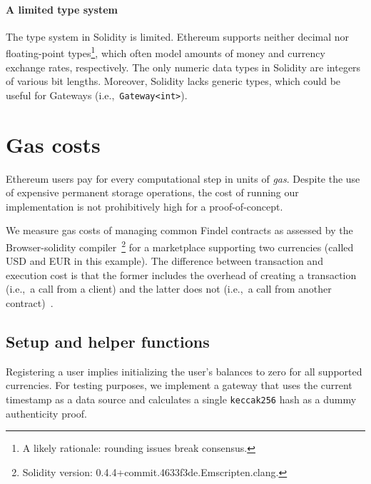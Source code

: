 \paragraph{A limited type system}
The type system in Solidity is limited.
Ethereum supports neither decimal nor floating-point types\footnote{A likely rationale: rounding issues break consensus.}, which often model amounts of money and currency exchange rates, respectively.
The only numeric data types in Solidity are integers of various bit lengths.
Moreover, Solidity lacks generic types, which could be useful for Gateways (i.e.,~\texttt{Gateway<int>}).


\section{Gas costs} \label{sec:Ch10FindelTesting}

Ethereum users pay for every computational step in units of \textit{gas}.
Despite the use of expensive permanent storage operations, the cost of running our implementation is not prohibitively high for a proof-of-concept.

We measure gas costs of managing common Findel contracts as assessed by the Browser-solidity compiler~\cite{BrowserSolidity}\footnote{Solidity version: 0.4.4+commit.4633f3de.Emscripten.clang.} for a marketplace supporting two currencies (called USD and EUR in this example).
The difference between transaction and execution cost is that the former includes the overhead of creating a transaction (i.e.,~a call from a client) and the latter does not (i.e.,~a call from another contract)~\cite{Revere2016}.

\subsection{Setup and helper functions}

Registering a user implies initializing the user's balances to zero for all supported currencies.
For testing purposes, we implement a gateway that uses the current timestamp as a data source and calculates a single \texttt{keccak256} hash as a dummy authenticity proof.

